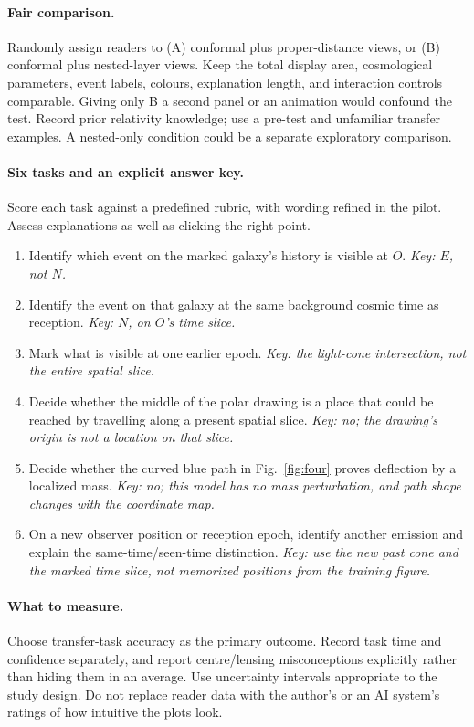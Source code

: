 \documentclass[11pt,a4paper]{article}
\begin{document}
\paragraph{Fair comparison.}
Randomly assign readers to (A) conformal plus proper-distance views, or
(B) conformal plus nested-layer views. Keep the total display area,
cosmological parameters, event labels, colours, explanation length, and
interaction controls comparable. Giving only B a second panel or an
animation would confound the test. Record prior relativity knowledge;
use a pre-test and unfamiliar transfer examples. A nested-only condition
could be a separate exploratory comparison.

\paragraph{Six tasks and an explicit answer key.}
Score each task against a predefined rubric, with wording refined in the
pilot. Assess explanations as well as clicking the right point.
\begin{enumerate}
\item Identify which event on the marked galaxy's history is visible at
$O$. \emph{Key: $E$, not $N$.}
\item Identify the event on that galaxy at the same background cosmic
time as reception. \emph{Key: $N$, on $O$'s time slice.}
\item Mark what is visible at one earlier epoch.
\emph{Key: the light-cone intersection, not the entire spatial slice.}
\item Decide whether the middle of the polar drawing is a place that
could be reached by travelling along a present spatial slice.
\emph{Key: no; the drawing's origin is not a location on that slice.}
\item Decide whether the curved blue path in Fig.~\ref{fig:four} proves
deflection by a localized mass. \emph{Key: no; this model has no mass
perturbation, and path shape changes with the coordinate map.}
\item On a new observer position or reception epoch, identify another
emission and explain the same-time/seen-time distinction.
\emph{Key: use the new past cone and the marked time slice, not memorized
positions from the training figure.}
\end{enumerate}

\paragraph{What to measure.}
Choose transfer-task accuracy as the primary outcome. Record task time
and confidence separately, and report centre/lensing misconceptions
explicitly rather than hiding them in an average. Use uncertainty intervals
appropriate to the study design. Do not replace reader data with the
author's or an AI system's ratings of how intuitive the plots look.
\end{document}
